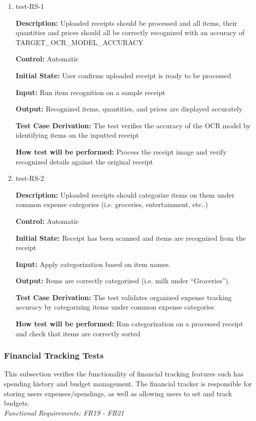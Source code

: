\documentclass[12pt, titlepage]{article}
\begin{document}
\begin{enumerate}
\item{test-RS-1\\}

\textbf{Description:} Uploaded receipts should be processed and all items, their quantities and prices should all be correctly recognized with an accuracy of TARGET\_OCR\_MODEL\_ACCURACY

\textbf{Control:} Automatic

\textbf{Initial State:} User confirms uploaded receipt is ready to be processed

\textbf{Input:} Run item recognition on a sample receipt

\textbf{Output:} Recognized items, quantities, and prices are displayed accurately

\textbf{Test Case Derivation:} The test verifies the accuracy of the OCR model by identifying items on the inputted receipt

\textbf{How test will be performed:} Process the receipt image and verify recognized details against the original receipt

\item{test-RS-2\\}

\textbf{Description:} Uploaded receipts should categorize items on them under common expense categories (i.e. groceries, entertainment, etc..)

\textbf{Control:} Automatic

\textbf{Initial State:} Receipt has been scanned and items are recognized from the receipt

\textbf{Input:} Apply categorization based on item names.

\textbf{Output:} Items are correctly categorized (i.e. milk under “Groceries”).

\textbf{Test Case Derivation:} The test validates organized expense tracking accuracy by categorizing items under common expense categories

\textbf{How test will be performed:} Run categorization on a processed receipt and check that items are correctly sorted
\end{enumerate}

\subsubsection{Financial Tracking Tests}

This subsection verifies the functionality of financial tracking features such has spending history and budget management. The financial tracker is responsible for storing users expenses/spendings, as well as allowing users to set and track budgets.\\
\textit{Functional Requirements: FR19 - FR21}
\end{document}
